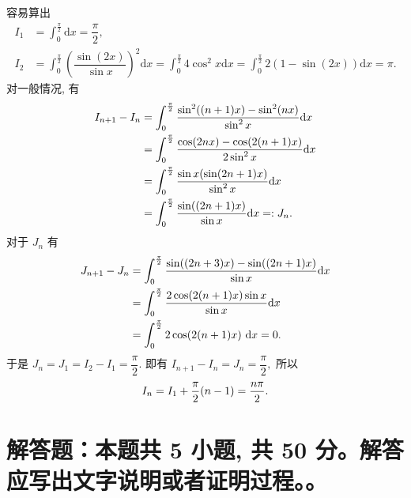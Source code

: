 \begin{solution}
容易算出 
\begin{equation*}
\begin{aligned}
I_1 & = \int_0^{\frac{\pi}{2}} \mathrm{d}x = \dfrac{\pi}{2}, \\
I_2 & = \int_0^{\frac{\pi}{2}} \left(\dfrac{\sin (2x)}{\sin x}\right)^2 \mathrm{d}x = \int_0^{\frac{\pi}{2}} 4 \cos^2 x \mathrm{d}x = \int_0^{\frac{\pi}{2}} 2(1 - \sin(2x)) \mathrm{d}x = \pi.
\end{aligned}
\end{equation*}
对一般情况, 有
\begin{equation*}
\begin{aligned}
I_{n+1} - I_{n} & = \int_0^{\frac{\pi}{2}} \dfrac{\sin^2((n+1)x) - \sin^2(nx)}{\sin^2 x} \mathrm{d}x \\
& = \int_0^{\frac{\pi}{2}} \dfrac{\cos(2nx) - \cos(2(n+1)x)}{2\sin^2 x} \mathrm{d}x \\
& = \int_0^{\frac{\pi}{2}} \dfrac{\sin x (\sin(2n+1)x)}{\sin^2 x} \mathrm{d}x \\
& = \int_0^{\frac{\pi}{2}} \dfrac{\sin((2n+1)x)}{\sin x} \mathrm{d}x =: J_n.
\end{aligned} \score{4}
\end{equation*}
对于 $J_n$ 有
\begin{equation*}
\begin{aligned}
J_{n+1} - J_n & = \int_0^{\frac{\pi}{2}} \dfrac{\sin((2n+3)x) - \sin((2n+1)x)}{\sin x} \mathrm{d}x \\
& = \int_0^{\frac{\pi}{2}} \dfrac{2 \cos(2(n+1)x) \sin x}{\sin x} \mathrm{d}x \\
& = \int_0^{\frac{\pi}{2}} 2 \cos(2(n+1)x) ~ \mathrm{d}x = 0.
\end{aligned} \score{2}
\end{equation*}
于是 $\displaystyle J_n = J_1 = I_2 - I_1 = \dfrac{\pi}{2}.$ 即有 $I_{n+1} - I_n = J_n = \dfrac{\pi}{2},$ 所以
\begin{equation*}
I_n = I_1 + \dfrac{\pi}{2}(n - 1) = \dfrac{n\pi}{2}. \score{1}
\end{equation*}
\end{solution}


\section{解答题：本题共 5 小题, 共 50 分。解答应写出文字说明或者证明过程。。}

